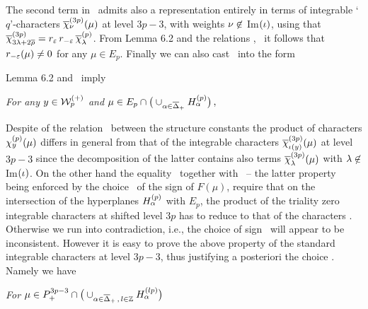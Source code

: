 %
\eqn{}
%
The second term in \qfcha\ admits
also a representation entirely in terms of integrable
`$q$'-characters $\overline{\chi}_{\nu}^{(3 p)}(\mu) $ at level $3p-3$, with
weights $\nu\not \in$ Im$( \iota)$, using that
$\overline{\chi}_{3\lambda+2\overline{\rho}}^{(3p)}= r_{\varepsilon}\, r_{-\varepsilon}\,\overline{\chi}_{\lambda}^{(p)}$.
{}From Lemma 6.2 and the relations \rrela, \rrel\ it follows that
$r_{-\varepsilon}(\mu)\not =0$ for any $\mu\in E_p$.
Finally we can also cast \qfcha\ into
 the form
%
\eqn{} 
% 


Lemma 6.2 and \qfcha\ imply 

 {\it For any   $y\in  {\cal W}^{(+)}_p$ and
 $\mu \in E_p\cap \big(\cup_{\alpha\in \overline\Delta_+} H_{\alpha}^{(p)}\big)\,,$}
%
\eqn{}
%

Despite of the relation \qstrci\ between  the structure constants
the product of characters $\chi_y^{(p)}(\mu)$ differs in general
from that of the integrable characters
$\overline{\chi}_{\iota(y)}^{(3p)}(\mu)$ at level $3p-3$ since the
decomposition of the latter contains also terms
$\overline{\chi}_{\lambda}^{(3p)}(\mu)$ with $\lambda\not \in$ Im$(\iota)$.  On the
other hand  the equality \qstrci\ together with \red\ -- the
latter property being enforced by the choice  \sg\ of the sign of
$F(\mu)$, require that on the intersection of the hyperplanes
$H_{\alpha}^{(p)}$ with $E_p$, the product   of the triality zero
integrable characters at shifted level $3p$ has to reduce to that
of the  characters \qfch.  Otherwise we run into contradiction,
i.e., the choice of sign \sg\ will appear to be inconsistent.
However it is easy to prove the above property of the standard
integrable characters at level $3p-3$, thus justifying a
posteriori the choice \sg. Namely we have

 {\it For  $ \mu\in P_+^{3p-3}\cap
\big(\cup_{\alpha\in \overline\Delta_+\,, \,  l\in \Bbb Z} 
H_{\alpha}^{(lp)}\big)\,$ }
%
\eqn{}
%

